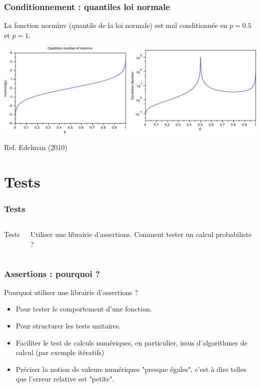 \documentclass{beamer}
\begin{document}
\begin{frame}[containsverbatim]
\frametitle{Conditionnement : quantiles loi normale}

La fonction \textrm{norminv} (quantile de la loi normale) 
est mal conditionnée en $p=0.5$ et $p=1$.

\begin{center}
\includegraphics[width=\textwidth]{condnorminv2}
\end{center}

Ref. Edelman (2010)

\end{frame}


\section{Tests}

\begin{frame}
\frametitle{Tests}
  \begin{columns}
    
    {\huge{Tests}}
	
	Utiliser une librairie d'assertions. 
	Comment tester un calcul probabiliste ?
  \end{columns}
\end{frame}

\begin{frame}
\frametitle{Assertions : pourquoi ?}

Pourquoi utiliser une librairie d'assertions ?
\begin{itemize}
\item Pour tester le comportement d'une fonction. 
\item Pour structurer les tests unitaires. 
\item Faciliter le test de calculs numériques, en particulier, 
issus d'algorithmes de calcul (par exemple itératifs)
\item Préciser la notion de valeurs numériques "presque égales", 
c'est à dire telles que l'erreur relative est "petite".
\end{itemize}

\end{frame}
\end{document}
